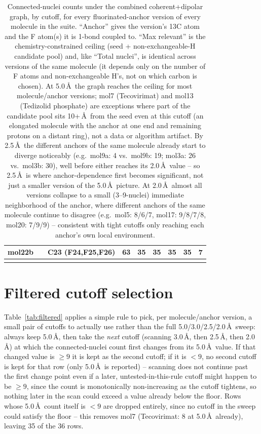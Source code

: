 \documentclass[11pt]{article}
\begin{document}
\begin{longtable}{@{}l l l r r r r r r@{}}
mol22b   &                          & C23 (F24,F25,F26)      &  63 &  35 &  35 &  35 &  35 &   7 \\
\bottomrule
\caption{Connected-nuclei counts under the combined coherent+dipolar graph,
by cutoff, for every fluorinated-anchor version of every molecule in the
suite. ``Anchor'' gives the version's 13C atom and the F atom(s) it is
1-bond coupled to. ``Max relevant'' is the chemistry-constrained ceiling
(seed + non-exchangeable-H candidate pool) and, like ``Total nuclei'', is
identical across versions of the same molecule (it depends only on the
number of F atoms and non-exchangeable H's, not on which carbon is chosen).
At 5.0\,\AA\ the graph reaches the ceiling for most molecule/anchor
versions; mol7 (Tecovirimat) and mol13 (Tedizolid phosphate) are exceptions
where part of the candidate pool sits 10+\,\AA\ from the seed even at this
cutoff (an elongated molecule with the anchor at one end and remaining
protons on a distant ring), not a data or algorithm artifact. By 2.5\,\AA\
the different anchors of the same molecule already start to diverge
noticeably (e.g.\ mol9a: 4 vs.\ mol9b: 19; mol3a: 26 vs.\ mol3b: 30), well
before either reaches its 2.0\,\AA\ value -- so 2.5\,\AA\ is where
anchor-dependence first becomes significant, not just a smaller version of
the 5.0\,\AA\ picture. At 2.0\,\AA\ almost all versions collapse to a small
(3--9-nuclei) immediate neighborhood of the anchor, where different anchors
of the same molecule continue to disagree (e.g.\ mol5: 8/6/7, mol17:
9/8/7/8, mol20: 7/9/9) -- consistent with tight cutoffs only reaching each
anchor's own local environment.\label{tab:connectivity}}
\end{longtable}

\section{Filtered cutoff selection}

Table~\ref{tab:filtered} applies a simple rule to pick, per molecule/anchor
version, a small pair of cutoffs to actually use rather than the full
5.0/3.0/2.5/2.0\,\AA\ sweep: always keep 5.0\,\AA, then take the \emph{next}
cutoff (scanning 3.0\,\AA, then 2.5\,\AA, then 2.0\,\AA) at which the
connected-nuclei count first changes from its 5.0\,\AA\ value. If that
changed value is $\geq 9$ it is kept as the second cutoff; if it is $<9$,
no second cutoff is kept for that row (only 5.0\,\AA\ is reported) --
scanning does not continue past the first change point even if a later,
untested-in-this-rule cutoff might happen to be $\geq 9$, since the count is
monotonically non-increasing as the cutoff tightens, so nothing later in
the scan could exceed a value already below the floor. Rows whose
5.0\,\AA\ count itself is $<9$ are dropped entirely, since no cutoff in the
sweep could satisfy the floor -- this removes mol7 (Tecovirimat: 8 at
5.0\,\AA\ already), leaving 35 of the 36 rows.
\end{document}

